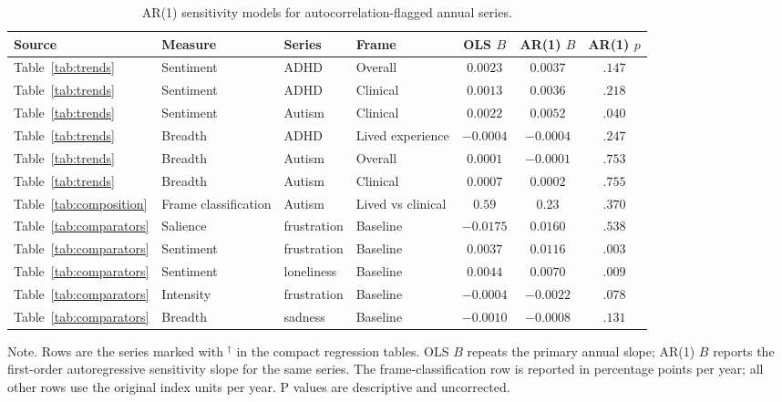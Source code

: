 \begin{table}[t!]
\centering
\caption{AR(1) sensitivity models for autocorrelation-flagged annual series.}
\label{tab:ar1}
\scriptsize
\begin{tabular}{@{}llllccc@{}}
\toprule
Source & Measure & Series & Frame & OLS $B$ & AR(1) $B$ & AR(1) $p$ \\
\midrule
Table~\ref{tab:trends} & Sentiment & ADHD & Overall & $0.0023$ & $0.0037$ & $.147$ \\
Table~\ref{tab:trends} & Sentiment & ADHD & Clinical & $0.0013$ & $0.0036$ & $.218$ \\
Table~\ref{tab:trends} & Sentiment & Autism & Clinical & $0.0022$ & $0.0052$ & $.040$ \\
Table~\ref{tab:trends} & Breadth & ADHD & Lived experience & $-0.0004$ & $-0.0004$ & $.247$ \\
Table~\ref{tab:trends} & Breadth & Autism & Overall & $0.0001$ & $-0.0001$ & $.753$ \\
Table~\ref{tab:trends} & Breadth & Autism & Clinical & $0.0007$ & $0.0002$ & $.755$ \\
Table~\ref{tab:composition} & Frame classification & Autism & Lived vs clinical & $0.59$ & $0.23$ & $.370$ \\
Table~\ref{tab:comparators} & Salience & frustration & Baseline & $-0.0175$ & $0.0160$ & $.538$ \\
Table~\ref{tab:comparators} & Sentiment & frustration & Baseline & $0.0037$ & $0.0116$ & $.003$ \\
Table~\ref{tab:comparators} & Sentiment & loneliness & Baseline & $0.0044$ & $0.0070$ & $.009$ \\
Table~\ref{tab:comparators} & Intensity & frustration & Baseline & $-0.0004$ & $-0.0022$ & $.078$ \\
Table~\ref{tab:comparators} & Breadth & sadness & Baseline & $-0.0010$ & $-0.0008$ & $.131$ \\
\bottomrule
\end{tabular}
\parbox{\linewidth}{\footnotesize Note. Rows are the series marked with $^{\dagger}$ in the compact regression tables. OLS $B$ repeats the primary annual slope; AR(1) $B$ reports the first-order autoregressive sensitivity slope for the same series. The frame-classification row is reported in percentage points per year; all other rows use the original index units per year. P values are descriptive and uncorrected.}
\end{table}
